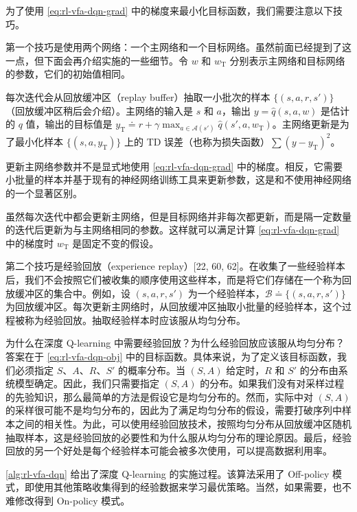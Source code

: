 为了使用 \cref{eq:rl-vfa-dqn-grad} 中的梯度来最小化目标函数，我们需要注意以下技巧。

第一个技巧是使用两个网络：一个主网络和一个目标网络。虽然前面已经提到了这一点，但下面会再介绍实施的一些细节。令 $w$ 和 $w_{\mathrm{T}}$ 分别表示主网络和目标网络的参数，它们的初始值相同。

每次迭代会从回放缓冲区（replay buffer）抽取一小批次的样本 $\{(s,a,r,s')\}$（回放缓冲区稍后会介绍）。主网络的输入是 $s$ 和 $a$，输出 $y=\hat{q}(s,a,w)$ 是估计的 $q$ 值，输出的目标值是 $y_{\mathrm{T}}\doteq r+\gamma\max_{a\in\mathcal{A}(s')} \hat{q}(s',a,w_{\mathrm{T}})$。主网络更新是为了最小化样本 $\{(s,a,y_{\mathrm{T}})\}$ 上的 TD 误差（也称为损失函数）$\sum(y-y_{\mathrm{T}})^{2}$。

更新主网络参数并不是显式地使用 \cref{eq:rl-vfa-dqn-grad} 中的梯度。相反，它需要小批量的样本并基于现有的神经网络训练工具来更新参数，这是和不使用神经网络的一个显著区别。

虽然每次迭代中都会更新主网络，但是目标网络并非每次都更新，而是隔一定数量的迭代后更新为与主网络相同的参数。这样就可以满足计算 \cref{eq:rl-vfa-dqn-grad} 中的梯度时 $w_{\mathrm{T}}$ 是固定不变的假设。

第二个技巧是经验回放（experience replay）[22, 60, 62]。在收集了一些经验样本后，我们不会按照它们被收集的顺序使用这些样本，而是将它们存储在一个称为回放缓冲区的集合中。例如，设 $(s, a, r, s')$ 为一个经验样本，$\mathcal{B} \doteq \{(s, a, r, s')\}$ 为回放缓冲区。每次更新主网络时，从回放缓冲区抽取小批量的经验样本，这个过程被称为经验回放。抽取经验样本时应该服从均匀分布。

为什么在深度 Q-learning 中需要经验回放？为什么经验回放应该服从均匀分布？答案在于 \cref{eq:rl-vfa-dqn-obj} 中的目标函数。具体来说，为了定义该目标函数，我们必须指定 $S$、$A$、$R$、$S'$ 的概率分布。当 $(S, A)$ 给定时，$R$ 和 $S'$ 的分布由系统模型确定。因此，我们只需要指定 $(S, A)$ 的分布。如果我们没有对采样过程的先验知识，那么最简单的方法是假设它是均匀分布的。然而，实际中对 $(S, A)$ 的采样很可能不是均匀分布的，因此为了满足均匀分布的假设，需要打破序列中样本之间的相关性。为此，可以使用经验回放技术，按照均匀分布从回放缓冲区随机抽取样本，这是经验回放的必要性和为什么服从均匀分布的理论原因。最后，经验回放的另一个好处是每个经验样本可能会被多次使用，可以提高数据利用率。

\cref{alg:rl-vfa-dqn} 给出了深度 Q-learning 的实施过程。该算法采用了 Off-policy 模式，即使用其他策略收集得到的经验数据来学习最优策略。当然，如果需要，也不难修改得到 On-policy 模式。

